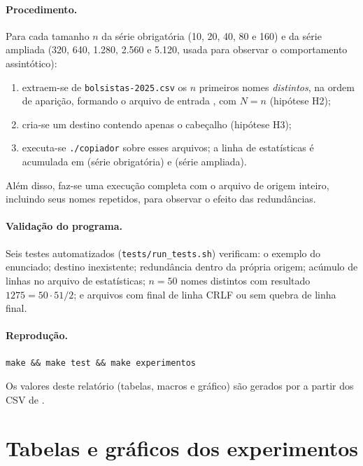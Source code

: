 \documentclass[11pt,a4paper]{article}
\begin{document}
\paragraph{Procedimento.} Para cada tamanho $n$ da série obrigatória (10, 20, 40,
80 e 160) e da série ampliada (320, 640, 1.280, 2.560 e 5.120, usada para observar o
comportamento assintótico):
\begin{enumerate}[nosep]
  \item extraem-se de \texttt{bolsistas-2025.csv} os $n$ primeiros nomes
        \emph{distintos}, na ordem de aparição, formando o arquivo de entrada
        , com $N=n$ (hipótese H2);
  \item cria-se um destino contendo apenas o cabeçalho (hipótese H3);
  \item executa-se \texttt{./copiador} sobre esses arquivos; a linha de estatísticas
        é acumulada em  (série obrigatória) e
         (série ampliada).
\end{enumerate}
Além disso, faz-se uma execução completa com o arquivo de origem inteiro,
incluindo seus nomes repetidos, para observar o efeito das redundâncias.

\paragraph{Validação do programa.} Seis testes automatizados
(\texttt{tests/run\_tests.sh}) verificam: o exemplo do enunciado; destino
inexistente; redundância dentro da própria origem; acúmulo de linhas no arquivo de
estatísticas; $n=50$ nomes distintos com resultado $1275=50\cdot 51/2$; e arquivos
com final de linha CRLF ou sem quebra de linha final.

\paragraph{Reprodução.}
\begin{center}\texttt{make \&\& make test \&\& make experimentos}\end{center}
Os valores deste relatório (tabelas, macros e gráfico) são gerados por
 a partir dos CSV de .

\section{Tabelas e gráficos dos experimentos}
\end{document}
